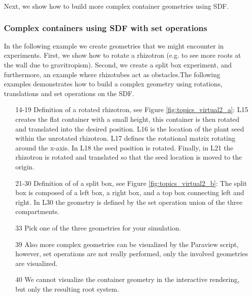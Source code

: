 Next, we show how to build more complex container geometries using SDF. 


\subsubsection*{Complex containers using SDF with set operations}

In the following example we create geometries that we might encounter in experiments. 
First, we show how to rotate a rhizotron (e.g. to see more roots at the wall due to gravitropism). 
Second, we create a split box experiment, and furthermore, an example where rhizotubes act as obstacles.The following examples demonstrates how to build a complex geometry using rotations, translations and set operations on the SDF.



\begin{itemize}
\item[14-19] Definition of a rotated rhizotron, see Figure \ref{fig:topics_virtual2_a}: 
L15 creates the flat container with a small height, this container is then rotated and translated into the desired position. L16 is the location of the plant seed within the unrotated rhizotron. L17 defines the rotational matrix rotating around the x-axis. In L18 the seed position is rotated. Finally, in L21 the rhizotron is rotated and translated so that the seed location is moved to the origin. 
\item[21-30] Definition of of a split box, see Figure \ref{fig:topics_virtual2_b}: 
The split box is composed of a left box, a right box, and a top box connecting left and right. 
In L30 the geometry is defined by the set operation union of the three compartments. 
\item[33] Pick one of the three geometries for your simulation.
\item[39] Also more complex geometries can be visualized by the Paraview script, 
however, set operations are not really performed, only the involved geometries are visualized.
\item[40] We cannot visualize the container geometry in the interactive rendering, but only the resulting root system. 
\end{itemize}

